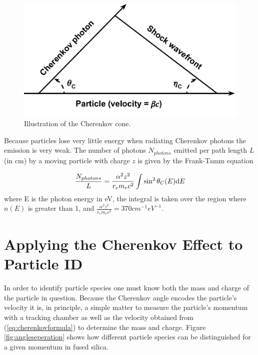 \begin{figure}[ht]
	\centering
	\includegraphics[scale=1]{figures/Cherenkov_cone.pdf}
	\caption{Illustration of the Cherenkov cone.}
	\label{fig:cherenkovcone}
\end{figure}

Because particles lose very little energy when radiating Cherenkov photons the emission is very weak. The number of photons $N_{photons}$ emitted per path length $L$ (in cm) by a moving particle with charge $z$ is given by the Frank-Tamm equation

\begin{equation}
	\frac{N_{photons}}{L} = \frac{\alpha^2 z^2}{r_e m_e c^2} \int \sin^2\theta_{C} (E) \mathrm{d} E
	\label{eq:nphotons}
\end{equation}
where E is the photon energy in eV, the integral is taken over the region where $n(E)$ is greater than 1, and $\frac{\alpha^2 z^2}{r_e m_e c^2} = 370\unit{cm}^{-1}\unit{eV}^{-1}$.

\section{Applying the Cherenkov Effect to Particle ID}
In order to identify particle species one must know both the mass and charge of the particle in question. Because the Cherenkov angle encodes the particle's velocity it is, in principle, a simple matter to measure the particle's momentum with a tracking chamber as well as the velocity obtained from (\ref{eq:cherenkovformula}) to determine the mass and charge. Figure \ref{fig:angleseperation} shows how different particle species can be distinguished for a given momentum in fused silica.

